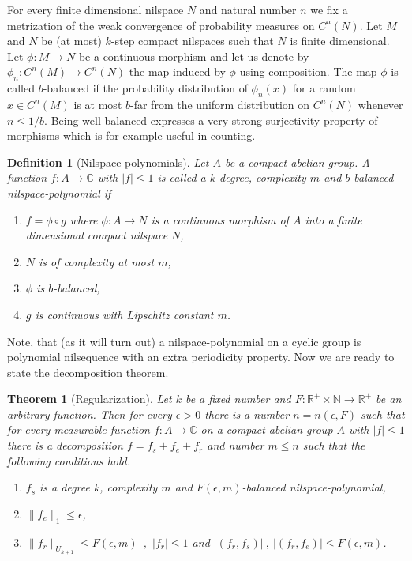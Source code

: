 \documentclass [11pt] {article}
\newtheorem{theorem}{Theorem}
\newtheorem{definition}{Definition}[section]
\begin{document}
For every finite dimensional nilspace $N$ and natural number $n$ we fix a metrization of the weak convergence of probability measures on $C^n(N)$.
Let $M$ and $N$ be (at most) $k$-step compact nilspaces such that $N$ is finite dimensional. Let $\phi:M\rightarrow N$ be a continuous morphism and let us denote by $\phi_n:C^n(M)\rightarrow C^n(N)$ the map induced by $\phi$ using composition. The map $\phi$ is called $b$-balanced if the probability distribution of $\phi_n(x)$ for a random $x\in C^n(M)$ is at most $b$-far from the uniform distribution on $C^n(N)$ whenever $n\leq 1/b$.
Being well balanced expresses a very strong surjectivity property of morphisms which is for example useful in counting. 


\begin{definition}[Nilspace-polynomials] Let $A$ be a compact abelian group. A function $f:A\rightarrow\mathbb{C}$ with $|f|\leq 1$ is called a $k$-degree, complexity $m$ and $b$-balanced nilspace-polynomial if
\begin{enumerate}
\item $f=\phi\circ g$ where $\phi:A\rightarrow N$ is a continuous morphism of $A$ into a finite dimensional compact nilspace $N$,
\item $N$ is of complexity at most $m$,
\item $\phi$ is $b$-balanced,
\item $g$ is continuous with Lipschitz constant $m$. 
\end{enumerate}
\end{definition}

Note, that (as it will turn out) a nilspace-polynomial on a cyclic group is polynomial nilsequence with an extra periodicity property.
Now we are ready to state the decomposition theorem.

\begin{theorem}[Regularization]\label{reglem} Let $k$ be a fixed number and $F:\mathbb{R}^+\times\mathbb{N}\rightarrow\mathbb{R^+}$ be an arbitrary function. Then for every $\epsilon>0$ there is a number $n=n(\epsilon,F)$ such that for every measurable function $f:A\rightarrow\mathbb{C}$ on a compact abelian group $A$ with $|f|\leq 1$ there is a decomposition $f=f_s+f_e+f_r$ and number $m\leq n$ such that the following conditions hold.
\begin{enumerate}
\item $f_s$ is a degree $k$, complexity $m$ and $F(\epsilon,m)$-balanced nilspace-polynomial,
\item $\|f_e\|_1\leq\epsilon$,
\item $\|f_r\|_{U_{k+1}}\leq F(\epsilon,m)$~,~$|f_r|\leq 1$ and $|(f_r,f_s)|~,~|(f_r,f_e)|\leq F(\epsilon,m)$.
\end{enumerate}
\end{theorem}
\end{document}
